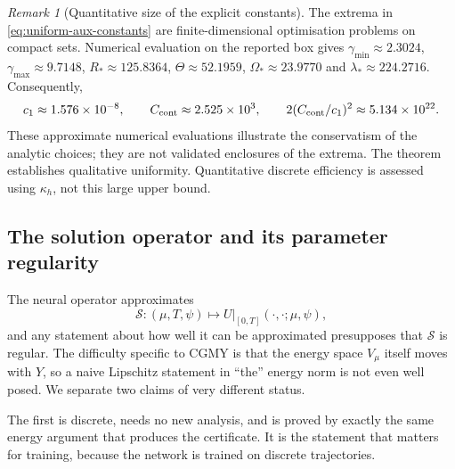 \documentclass[11pt]{amsart}
\theoremstyle{remark}
\newtheorem{remark}[theorem]{Remark}
\newcommand{\Sop}{\mathcal{S}}
\newcommand{\Vmu}{V_{\mu}}
\begin{document}
\begin{remark}[Quantitative size of the explicit constants]
\label{rem:constants-computable}
The extrema in \eqref{eq:uniform-aux-constants} are finite-dimensional
optimisation problems on compact sets. Numerical evaluation on the reported
box gives $\gamma_{\min}\approx2.3024$, $\gamma_{\max}\approx9.7148$,
$R_\ast\approx125.8364$, $\Theta\approx52.1959$,
$\Omega_\ast\approx23.9770$ and $\lambda_\ast\approx224.2716$.
Consequently,
\[
 c_1\approx1.576\times10^{-8},\qquad
 C_{\rm cont}\approx2.525\times10^3,\qquad
 2(C_{\rm cont}/c_1)^2\approx5.134\times10^{22}.
\]
These approximate numerical evaluations illustrate the conservatism of the
analytic choices; they are not validated enclosures of the extrema. The
theorem establishes qualitative uniformity. Quantitative discrete efficiency
is assessed using $\kappa_h$, not this large upper bound.
\end{remark}

\subsection{The solution operator and its parameter regularity}
\label{ssec:solution-operator}

The neural operator approximates
\begin{equation}
  \Sop:(\mu,T,\psi)\longmapsto U|_{[0,T]}(\cdot,\cdot;\mu,\psi),
  \label{eq:solution-operator}
\end{equation}
and any statement about how well it can be approximated presupposes that
$\Sop$ is regular.  The difficulty specific to CGMY is that the energy space
$\Vmu$ itself moves with $Y$, so a naive Lipschitz statement in ``the'' energy
norm is not even well posed.  We separate two claims of very different status.

The first is discrete, needs no new analysis, and is proved by exactly the
same energy argument that produces the certificate.  It is the statement that
matters for training, because the network is trained on discrete
trajectories.
\end{document}
